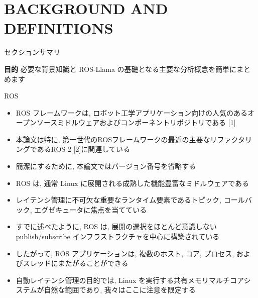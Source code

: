 
\section{BACKGROUND AND DEFINITIONS}
\label{sec: background and definitions}

\begin{frame}{セクションサマリ}
    \begin{itembox}[l]{\textbf{目的}}
        必要な背景知識と ROS-Llama の基礎となる主要な分析概念を簡単にまとめます
    \end{itembox}
\end{frame}

\begin{frame}{ROS}
    \begin{itemize}
        \item ROS フレームワークは, ロボット工学アプリケーション向けの人気のあるオープンソースミドルウェアおよびコンポーネントリポジトリである [1]
        \item 本論文は特に, 第一世代のROSフレームワークの最近の主要なリファクタリングであるROS 2 [2]に関連している
        \item 簡潔にするために, 本論文ではバージョン番号を省略する
    \end{itemize}
\end{frame}

\begin{frame}{}
    \begin{itemize}
        \item ROS は, 通常 Linux に展開される成熟した機能豊富なミドルウェアである
        \item レイテンシ管理に不可欠な重要なランタイム要素であるトピック, コールバック, エグゼキュータに焦点を当てている
    \end{itemize}
\end{frame}

\begin{frame}{}
    \begin{itemize}
        \item すでに述べたように, ROS は, 展開の選択をほとんど意識しない publish/subscribe インフラストラクチャを中心に構築されている
        \item したがって, ROS アプリケーションは, 複数のホスト, コア, プロセス, およびスレッドにまたがることができる
        \item 自動レイテンシ管理の目的では, Linux を実行する共有メモリマルチコアシステムが自然な範囲であり, 我々はここに注意を限定する
    \end{itemize}
\end{frame}

